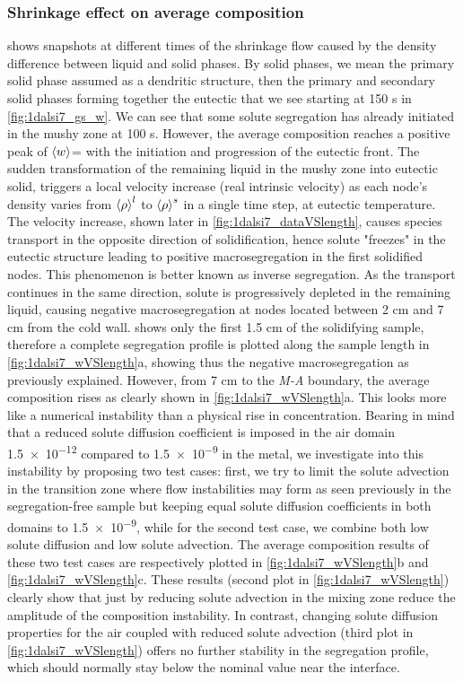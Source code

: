\subsubsection{Shrinkage effect on average composition}
 shows snapshots at different times of the shrinkage flow caused by the density difference between liquid and solid phases.
By solid phases, we mean the primary solid phase assumed as a dendritic structure, then the primary and secondary solid phases forming together the eutectic
that we see starting at 150 s in \cref{fig:1dalsi7_gs_w}. We can see that some solute segregation has already initiated in the mushy zone at 100 s.
However, the average composition reaches a positive peak of $\left \langle w \right \rangle$= with the initiation and progression of the eutectic front.
The sudden transformation of the remaining liquid in the mushy zone into eutectic solid, triggers a local velocity increase (real intrinsic velocity)
as each node's density varies from $\left \langle \rho \right \rangle^l$ to $\left \langle \rho \right \rangle^s$ in a single time step, at eutectic temperature. The velocity increase, shown later in \cref{fig:1dalsi7_dataVSlength},
causes species transport in the opposite direction of solidification, hence solute "freezes" in the eutectic structure leading to positive macrosegregation
in the first solidified nodes. This phenomenon is better known as inverse segregation. 
As the transport continues in the same direction, 
solute is progressively depleted in the remaining liquid, causing negative macrosegregation at nodes located between 2 cm and 7 cm from the cold wall.
 shows only the first 1.5 cm of the solidifying sample, therefore a complete segregation profile is plotted along the sample length in \cref{fig:1dalsi7_wVSlength}a,
showing thus the negative macrosegregation as previously explained.
However, from 7 cm to the \emph{M-A} boundary, the average composition rises as clearly shown in \cref{fig:1dalsi7_wVSlength}a. This looks more like a numerical
instability than a physical rise in concentration. 
Bearing in mind that a reduced solute diffusion coefficient is imposed in the air domain \SI{1.5e-12}{\udiffusivity} compared to 
\SI{1.5e-9}{\udiffusivity} in the metal, we investigate into this instability by proposing two test cases: first, we try to limit the solute advection in the transition
zone where flow instabilities may form as seen previously in the segregation-free sample but keeping equal solute diffusion coefficients in both domains to \SI{1.5e-9}{\udiffusivity},
while for the second test case, we combine both low solute diffusion and low solute advection. The average composition results of these two test cases
are respectively plotted in \cref{fig:1dalsi7_wVSlength}b and \cref{fig:1dalsi7_wVSlength}c.
These results (second plot in \cref{fig:1dalsi7_wVSlength})  clearly show that just by reducing solute advection in the mixing zone reduce the amplitude of the composition instability.
In contrast, changing solute diffusion properties for the air coupled with reduced solute advection (third plot in \cref{fig:1dalsi7_wVSlength}) offers no further stability
in the segregation profile, which should normally stay below the nominal value near the interface.

